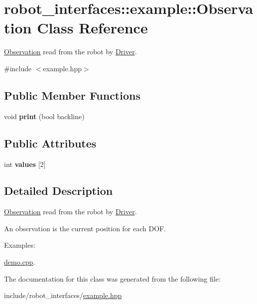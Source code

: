 \hypertarget{classrobot__interfaces_1_1example_1_1Observation}{}\section{robot\+\_\+interfaces\+:\+:example\+:\+:Observation Class Reference}
\label{classrobot__interfaces_1_1example_1_1Observation}


\hyperlink{classrobot__interfaces_1_1example_1_1Observation}{Observation} read from the robot by \hyperlink{classrobot__interfaces_1_1example_1_1Driver}{Driver}.  




{\ttfamily \#include $<$example.\+hpp$>$}

\subsection*{Public Member Functions}
\begin{DoxyCompactItemize}
\item 
\mbox{\label{classrobot__interfaces_1_1example_1_1Observation_af363ed16350ab130e4a6ba4e2e6bbe0e}} 
void {\bfseries print} (bool backline)
\end{DoxyCompactItemize}
\subsection*{Public Attributes}
\begin{DoxyCompactItemize}
\item 
\mbox{\label{classrobot__interfaces_1_1example_1_1Observation_ae7dd8df574cd0a303999e945188c353e}} 
int {\bfseries values} \mbox{[}2\mbox{]}
\end{DoxyCompactItemize}


\subsection{Detailed Description}
\hyperlink{classrobot__interfaces_1_1example_1_1Observation}{Observation} read from the robot by \hyperlink{classrobot__interfaces_1_1example_1_1Driver}{Driver}. 

An observation is the current position for each D\+OF. \begin{Desc}
\item[Examples\+: ]\par
\hyperlink{demo_8cpp-example}{demo.\+cpp}.\end{Desc}


The documentation for this class was generated from the following file\+:\begin{DoxyCompactItemize}
\item 
include/robot\+\_\+interfaces/\hyperlink{example_8hpp}{example.\+hpp}\end{DoxyCompactItemize}
